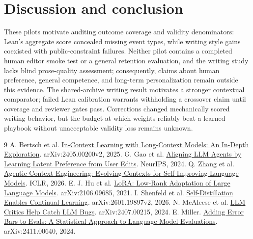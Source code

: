 \documentclass[10pt,twocolumn,letterpaper]{article}
\newcommand{\claim}[2]{#2}
\begin{document}
\section{Discussion and conclusion}
\claim{C59}{These pilots motivate auditing outcome coverage and validity denominators: Lean's aggregate score concealed missing event types, while writing style gains coexisted with public-constraint failures.}
\claim{C60}{Neither pilot contains a completed human editor smoke test or a general retention evaluation, and the writing study lacks blind prose-quality assessment; consequently, claims about human preference, general competence, and long-term personalization remain outside this evidence.}
\claim{C61}{The shared-archive writing result motivates a stronger contextual comparator; failed Lean calibration warrants withholding a crossover claim until coverage and reviewer gates pass.}
\claim{C62}{Corrections changed mechanically scored writing behavior, but the budget at which weights reliably beat a learned playbook without unacceptable validity loss remains unknown.}

{\small
\begin{thebibliography}{9}
 A. Bertsch et al. \href{https://arxiv.org/abs/2405.00200v2}{In-Context Learning with Long-Context Models: An In-Depth Exploration}. arXiv:2405.00200v2, 2025.
 G. Gao et al. \href{https://arxiv.org/abs/2404.15269}{Aligning LLM Agents by Learning Latent Preference from User Edits}. NeurIPS, 2024.
 Q. Zhang et al. \href{https://arxiv.org/abs/2510.04618v3}{Agentic Context Engineering: Evolving Contexts for Self-Improving Language Models}. ICLR, 2026.
 E. J. Hu et al. \href{https://arxiv.org/abs/2106.09685}{LoRA: Low-Rank Adaptation of Large Language Models}. arXiv:2106.09685, 2021.
 I. Shenfeld et al. \href{https://arxiv.org/abs/2601.19897v2}{Self-Distillation Enables Continual Learning}. arXiv:2601.19897v2, 2026.
 N. McAleese et al. \href{https://arxiv.org/abs/2407.00215}{LLM Critics Help Catch LLM Bugs}. arXiv:2407.00215, 2024.
 E. Miller. \href{https://arxiv.org/abs/2411.00640}{Adding Error Bars to Evals: A Statistical Approach to Language Model Evaluations}. arXiv:2411.00640, 2024.
\end{thebibliography}
}
\end{document}
